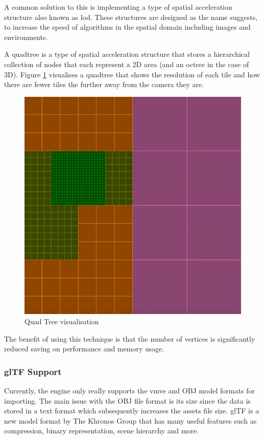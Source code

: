 \documentclass[11pt]{article}
\begin{document}
A common solution to this is implementing a type of spatial acceleration
structure also known as \gls*{lod}. These structures are designed as the name
suggests, to increase the speed of algorithms in the spatial domain including
images and environments.

A quadtree is a type of spatial acceleration structure that stores a
hierarchical collection of nodes that each represent a 2D area (and an octree in
the case of 3D). Figure \ref{fig:quad_tree} visualises a quadtree that shows
the resolution of each tile and how there are fewer tiles the further away from
the camera they are.

\begin{figure}[H]
  \centering
  \includegraphics[width=\textwidth]{images/quad_tree.png}
  \caption{Quad Tree visualisation}
  \label{fig:quad_tree}
\end{figure}

The benefit of using this technique is that the number of vertices is
significantly reduced saving on performance and memory usage.


\subsubsection{glTF Support}
Currently, the engine only really supports the \gls*{vmve} and OBJ model formats for
importing. The main issue with the OBJ file format is its size since the data is
stored in a text format which subsequently increases the assets file size. glTF
\cite{gltf} is a new model format by The Khronos Group that has many useful
features such as compression, binary representation, scene hierarchy and more.
\end{document}
